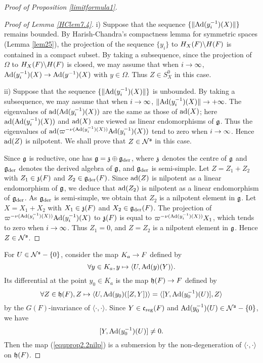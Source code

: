 \documentclass[a4paper]{amsart}
\theoremstyle{definition}
\theoremstyle{remark}
\numberwithin{equation}{subsection}
\begin{document}
\begin{proof}[Proof of Proposition \ref{limitformula1}]
\begin{proof}[Proof of Lemma \ref{HClem7.4}]
i) Suppose that the sequence $\{\|{\mathrm{Ad}}(y_i^{-1})(X)\|\}$ remains bounded. By Harish-Chandra's compactness lemma for symmetric spaces (Lemma \ref{lem25}), the projection of the sequence $\{y_i\}$ to $H_X(F)\backslash H(F)$ is contained in a compact subset. By taking a subsequence, since the projection of $\Omega$ to $H_X(F)\backslash H(F)$ is closed, we may assume that when $i\rightarrow\infty$, ${\mathrm{Ad}}(y_i^{-1})(X)\rightarrow {\mathrm{Ad}}(y^{-1})(X)$ with $y\in\Omega$. Thus $Z\in S_X^0$ in this case. 

ii) Suppose that the sequence $\{\|{\mathrm{Ad}}(y_i^{-1})(X)\|\}$ is unbounded. By taking a subsequence, we may assume that when $i\rightarrow\infty$, $\|{\mathrm{Ad}}(y_i^{-1})(X)\|\rightarrow+\infty$. The eigenvalues of ${\mathrm{ad}}({\mathrm{Ad}}(y_i^{-1})(X))$ are the same as those of ${\mathrm{ad}}(X)$; here ${\mathrm{ad}}({\mathrm{Ad}}(y_i^{-1})(X))$ and ${\mathrm{ad}}(X)$ are viewed as linear endomorphisms of ${\mathfrak{g}}$. Thus the eigenvalues of ${\mathrm{ad}}(\varpi^{-\nu({\mathrm{Ad}}(y_i^{-1})(X))}{\mathrm{Ad}}(y_i^{-1})(X))$ tend to zero when $i\rightarrow\infty$. Hence ${\mathrm{ad}}(Z)$ is nilpotent. We shall prove that $Z\in{\mathcal {N}}^{\mathfrak{s}}$ in this case. 

Since ${\mathfrak{g}}$ is reductive, one has ${\mathfrak{g}}={\mathfrak{z}}\oplus{\mathfrak{g}}_{\mathrm{der}}$, where ${\mathfrak{z}}$ denotes the centre of ${\mathfrak{g}}$ and ${\mathfrak{g}}_{\mathrm{der}}$ denotes the derived algebra of ${\mathfrak{g}}$, and ${\mathfrak{g}}_{\mathrm{der}}$ is semi-simple. Let $Z=Z_1+Z_2$ with $Z_1\in{\mathfrak{z}}(F)$ and $Z_2\in{\mathfrak{g}}_{\mathrm{der}}(F)$. Since ${\mathrm{ad}}(Z)$ is nilpotent as a linear endomorphism of ${\mathfrak{g}}$, we deduce that ${\mathrm{ad}}(Z_2)$ is nilpotent as a linear endomorphism of ${\mathfrak{g}}_{\mathrm{der}}$. As ${\mathfrak{g}}_{\mathrm{der}}$ is semi-simple, we obtain that $Z_2$ is a nilpotent element in ${\mathfrak{g}}$. Let $X=X_1+X_2$ with $X_1\in{\mathfrak{z}}(F)$ and $X_2\in{\mathfrak{g}}_{\mathrm{der}}(F)$. The projection of $\varpi^{-\nu({\mathrm{Ad}}(y_i^{-1})(X))}{\mathrm{Ad}}(y_i^{-1})(X)$ to ${\mathfrak{z}}(F)$ is equal to $\varpi^{-\nu({\mathrm{Ad}}(y_i^{-1})(X))}X_1$, which tends to zero when $i\rightarrow\infty$. Thus $Z_1=0$, and $Z=Z_2$ is a nilpotent element in ${\mathfrak{g}}$. Hence $Z\in{\mathcal {N}}^{\mathfrak{s}}$. 
\end{proof}

For $U\in{\mathcal {N}}^{\mathfrak{s}}-\{0\}$, consider the map $K_a\rightarrow F$ defined by
\begin{equation}\label{equprop2.2nilp}
 \forall y\in K_a, y\mapsto \langle U,{\mathrm{Ad}}(y)(Y) \rangle. 
\end{equation}
Its differential at the point $y_0\in K_a$ is the map ${\mathfrak{h}}(F)\rightarrow F$ defined by
$$ \forall Z\in {\mathfrak{h}}(F), Z\mapsto \langle U,{\mathrm{Ad}}(y_0)([Z,Y]) \rangle=\langle [Y, {\mathrm{Ad}}(y_0^{-1})(U)] , Z \rangle $$
by the $G(F)$-invariance of $\langle \cdot,\cdot \rangle$. Since $Y\in{\mathfrak{c}}_{\mathrm{reg}}(F)$ and ${\mathrm{Ad}}(y_0^{-1})(U)\in{\mathcal {N}}^{\mathfrak{s}}-\{0\}$, we have
$$ [Y, {\mathrm{Ad}}(y_0^{-1})(U)]\neq 0. $$
Then the map (\ref{equprop2.2nilp}) is a submersion by the non-degeneration of $\langle \cdot,\cdot \rangle$ on ${\mathfrak{h}}(F)$. 


\end{proof}
\end{document}
